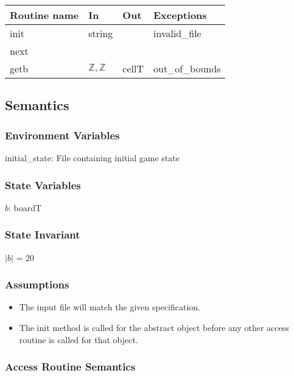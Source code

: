 \documentclass[12pt]{article}
\begin{document}
\begin{tabular}{| l | l | l | p{7cm} |}
\hline
\textbf{Routine name} & \textbf{In} & \textbf{Out} & \textbf{Exceptions}\\
\hline
init & string & ~ & invalid\_file\\
\hline
next & ~ & ~ & ~\\
\hline
getb & $\mathbb{Z}, \mathbb{Z}$ & cellT & out\_of\_bounds\\
\hline
\end{tabular}

\subsection* {Semantics}

\subsubsection* {Environment Variables}
initial\_state: File containing initial game state

\subsubsection* {State Variables}

$b$: boardT

\subsubsection* {State Invariant}

$|b|$ = 20

\subsubsection* {Assumptions}

\begin{itemize}
\item The input file will match the given specification. 
\item The init method is called for the abstract object before any other access routine is called for that object.
\end{itemize}

\subsubsection* {Access Routine Semantics}
\end{document}
